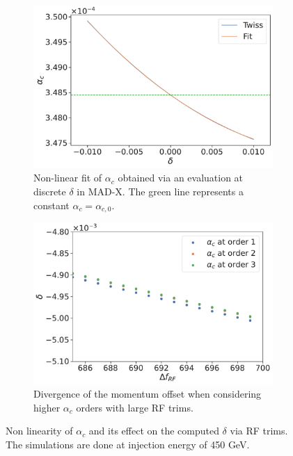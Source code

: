 \begin{figure}[tbh]
    \centering
    \begin{subfigure}[t]{0.48\textwidth}
        \centering
        \includegraphics[width=\textwidth]{images/higher_order_momentum_compaction_factor.pdf}
        \caption{Non-linear fit of $\alpha_c$ obtained via an evaluation at discrete $\delta$ in
        MAD-X. The green line represents a constant $\alpha_c = \alpha_{c,0}$.}
    \end{subfigure}
    \hfill
    \begin{subfigure}[t]{0.48\textwidth}
        \centering
        \includegraphics[width=\textwidth]{images/delta_vs_frf_alpha_c.pdf}
        \caption{Divergence of the momentum offset when considering higher $\alpha_c$ orders with
        large RF trims.}
    \end{subfigure}
    \caption{Non linearity of $\alpha_c$ and its effect on the computed $\delta$ via RF trims. The
    simulations are done at injection energy of 450 GeV.}
    \label{fig:decapoles:chromaticity:momentum_compaction_factor}
\end{figure}

